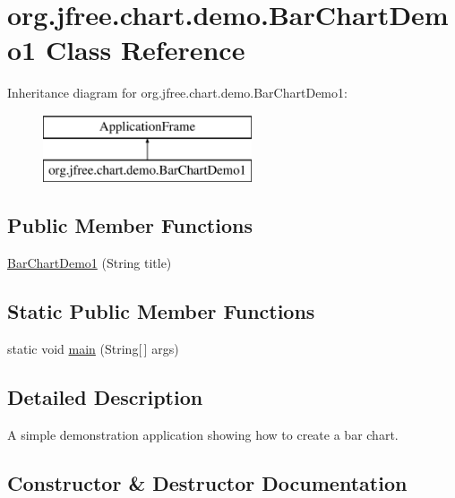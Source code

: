 \hypertarget{classorg_1_1jfree_1_1chart_1_1demo_1_1_bar_chart_demo1}{}\section{org.\+jfree.\+chart.\+demo.\+Bar\+Chart\+Demo1 Class Reference}
\label{classorg_1_1jfree_1_1chart_1_1demo_1_1_bar_chart_demo1}
Inheritance diagram for org.\+jfree.\+chart.\+demo.\+Bar\+Chart\+Demo1\+:\begin{figure}[H]
\begin{center}
\leavevmode
\includegraphics[height=2.000000cm]{classorg_1_1jfree_1_1chart_1_1demo_1_1_bar_chart_demo1}
\end{center}
\end{figure}
\subsection*{Public Member Functions}
\begin{DoxyCompactItemize}
\item 
\mbox{\hyperlink{classorg_1_1jfree_1_1chart_1_1demo_1_1_bar_chart_demo1_ad3f2a51d55036950951a353a50678c5d}{Bar\+Chart\+Demo1}} (String title)
\end{DoxyCompactItemize}
\subsection*{Static Public Member Functions}
\begin{DoxyCompactItemize}
\item 
static void \mbox{\hyperlink{classorg_1_1jfree_1_1chart_1_1demo_1_1_bar_chart_demo1_a8d88959292e005af1bc56f820f128a65}{main}} (String\mbox{[}$\,$\mbox{]} args)
\end{DoxyCompactItemize}


\subsection{Detailed Description}
A simple demonstration application showing how to create a bar chart. 

\subsection{Constructor \& Destructor Documentation}
\mbox{\label{classorg_1_1jfree_1_1chart_1_1demo_1_1_bar_chart_demo1_ad3f2a51d55036950951a353a50678c5d}} 
